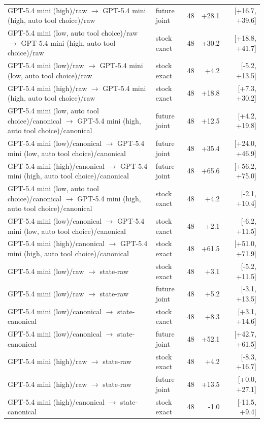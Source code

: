 \begin{table}[htbp]
{\begin{tabular}{lllrr}
GPT-5.4 mini (high)/raw $\to$ GPT-5.4 mini (high, auto tool choice)/raw & future joint & 48 & +28.1 & [+16.7, +39.6] \\
GPT-5.4 mini (low, auto tool choice)/raw $\to$ GPT-5.4 mini (high, auto tool choice)/raw & stock exact & 48 & +30.2 & [+18.8, +41.7] \\
GPT-5.4 mini (low)/raw $\to$ GPT-5.4 mini (low, auto tool choice)/raw & stock exact & 48 & +4.2 & [-5.2, +13.5] \\
GPT-5.4 mini (high)/raw $\to$ GPT-5.4 mini (high, auto tool choice)/raw & stock exact & 48 & +18.8 & [+7.3, +30.2] \\
GPT-5.4 mini (low, auto tool choice)/canonical $\to$ GPT-5.4 mini (high, auto tool choice)/canonical & future joint & 48 & +12.5 & [+4.2, +19.8] \\
GPT-5.4 mini (low)/canonical $\to$ GPT-5.4 mini (low, auto tool choice)/canonical & future joint & 48 & +35.4 & [+24.0, +46.9] \\
GPT-5.4 mini (high)/canonical $\to$ GPT-5.4 mini (high, auto tool choice)/canonical & future joint & 48 & +65.6 & [+56.2, +75.0] \\
GPT-5.4 mini (low, auto tool choice)/canonical $\to$ GPT-5.4 mini (high, auto tool choice)/canonical & stock exact & 48 & +4.2 & [-2.1, +10.4] \\
GPT-5.4 mini (low)/canonical $\to$ GPT-5.4 mini (low, auto tool choice)/canonical & stock exact & 48 & +2.1 & [-6.2, +11.5] \\
GPT-5.4 mini (high)/canonical $\to$ GPT-5.4 mini (high, auto tool choice)/canonical & stock exact & 48 & +61.5 & [+51.0, +71.9] \\
GPT-5.4 mini (low)/raw $\to$ state-raw & stock exact & 48 & +3.1 & [-5.2, +11.5] \\
GPT-5.4 mini (low)/raw $\to$ state-raw & future joint & 48 & +5.2 & [-3.1, +13.5] \\
GPT-5.4 mini (low)/canonical $\to$ state-canonical & stock exact & 48 & +8.3 & [+3.1, +14.6] \\
GPT-5.4 mini (low)/canonical $\to$ state-canonical & future joint & 48 & +52.1 & [+42.7, +61.5] \\
GPT-5.4 mini (high)/raw $\to$ state-raw & stock exact & 48 & +4.2 & [-8.3, +16.7] \\
GPT-5.4 mini (high)/raw $\to$ state-raw & future joint & 48 & +13.5 & [+0.0, +27.1] \\
GPT-5.4 mini (high)/canonical $\to$ state-canonical & stock exact & 48 & -1.0 & [-11.5, +9.4] \\

\end{tabular}}
\end{table}
